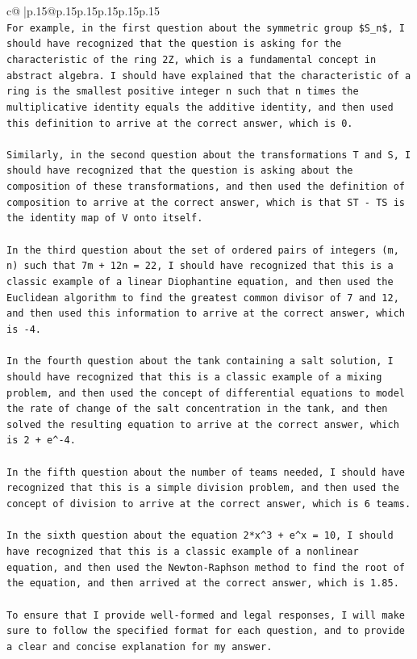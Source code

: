 \documentclass{article}
\begin{document}
{\begin{supertabular}{c@{$\;$}|p{.15\linewidth}@{}p{.15\linewidth}p{.15\linewidth}p{.15\linewidth}p{.15\linewidth}p{.15\linewidth}}
{{{\\ 
\texttt{For example, in the first question about the symmetric group \$S\_n\$, I should have recognized that the question is asking for the characteristic of the ring 2Z, which is a fundamental concept in abstract algebra. I should have explained that the characteristic of a ring is the smallest positive integer n such that n times the multiplicative identity equals the additive identity, and then used this definition to arrive at the correct answer, which is 0.} \\
\\ 
\texttt{Similarly, in the second question about the transformations T and S, I should have recognized that the question is asking about the composition of these transformations, and then used the definition of composition to arrive at the correct answer, which is that ST {-} TS is the identity map of V onto itself.} \\
\\ 
\texttt{In the third question about the set of ordered pairs of integers (m, n) such that 7m + 12n = 22, I should have recognized that this is a classic example of a linear Diophantine equation, and then used the Euclidean algorithm to find the greatest common divisor of 7 and 12, and then used this information to arrive at the correct answer, which is {-}4.} \\
\\ 
\texttt{In the fourth question about the tank containing a salt solution, I should have recognized that this is a classic example of a mixing problem, and then used the concept of differential equations to model the rate of change of the salt concentration in the tank, and then solved the resulting equation to arrive at the correct answer, which is 2 + e\^{}{-}4.} \\
\\ 
\texttt{In the fifth question about the number of teams needed, I should have recognized that this is a simple division problem, and then used the concept of division to arrive at the correct answer, which is 6 teams.} \\
\\ 
\texttt{In the sixth question about the equation 2*x\^{}3 + e\^{}x = 10, I should have recognized that this is a classic example of a nonlinear equation, and then used the Newton{-}Raphson method to find the root of the equation, and then arrived at the correct answer, which is 1.85.} \\
\\ 
\texttt{To ensure that I provide well{-}formed and legal responses, I will make sure to follow the specified format for each question, and to provide a clear and concise explanation for my answer.} \\
}}}
\end{supertabular}}
\end{document}
